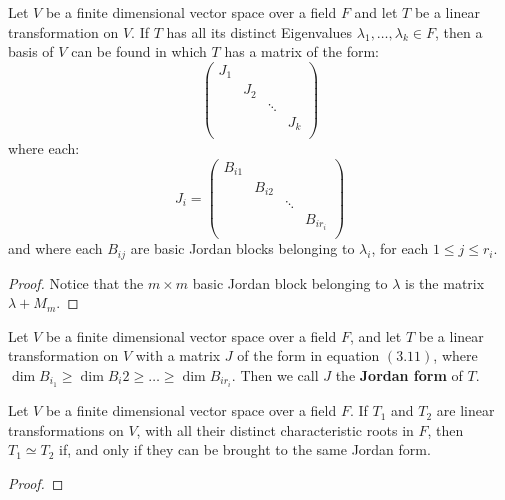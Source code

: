 \begin{theorem}\label{3.4.19}
    Let $V$ be a finite dimensional vector space over a field  $F$ and let  $T$
    be a linear transformation on  $V$. If  $T$ has all its distinct
    Eigenvalues $\lambda_1, \dots, \lambda_k \in F$, then a basis of $V$ can be
    found in which  $T$ has a matrix of the form:
        \begin{equation}
            \begin{pmatrix}
                J_1 &  &    &    \\
                    &   J_2 &    \\
                    &   &   \ddots  &   \\
                    &   &   &   J_k \\
            \end{pmatrix}
        \end{equation}
    where each:
        \begin{equation}
            J_i=\begin{pmatrix}
                B_{i1} &  &    &    \\
                    &   B_{i2} &    \\
                    &   &   \ddots  &   \\
                    &   &   &   B_{ir_i} \\
            \end{pmatrix}
        \end{equation}
    and where each $B_{ij}$ are basic Jordan blocks belonging to  $\lambda_i$,
    for each  $1 \leq j \leq r_i$.
\end{theorem}
\begin{proof}
    Notice that the $m \times m$ basic Jordan block belonging to  $\lambda$ is
    the matrix  $\lambda+M_m$.
\end{proof}

\begin{definition}
    Let $V$ be a finite dimensional vector space over a field  $F$, and let
    $T$ be a linear transformation on  $V$ with a matrix $J$ of the form in
    equation $(3.11)$, where $\dim{B_{i_1}} \geq \dim{B_i2} \geq \dots \geq
    \dim{B_{ir_i}}$. Then we call $J$ the  \textbf{Jordan form} of $T$.
\end{definition}

\begin{lemma}\label{3.4.20}
    Let $V$ be a finite dimensional vector space over a field  $F$. If  $T_1$
    and $T_2$ are linear transformations on $V$, with all their distinct
    characteristic roots in  $F$, then  $T_1 \simeq T_2$ if, and only if they
    can be brought to the same Jordan form.
\end{lemma}
\begin{proof}
\end{proof}

